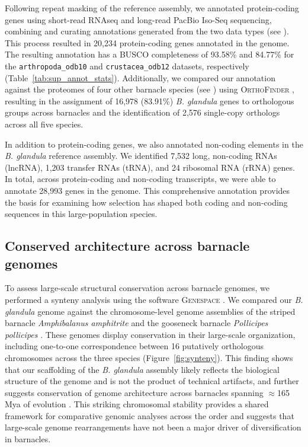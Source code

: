 \documentclass[11pt]{article}
\newcommand{\bgla}{\textit{B. glandula}\xspace}
\begin{document}
Following repeat masking of the reference assembly, we annotated protein-coding
genes using short-read RNAseq and long-read PacBio Iso-Seq sequencing, combining
and curating annotations generated from the two data types (see
). This process resulted in 20,234
protein-coding genes annotated in the genome. The resulting annotation has a
\textsc{BUSCO} completeness of 93.58\% and 84.77\% for the
\texttt{arthropoda\_odb10} and \texttt{crustacea\_odb12} datasets, respectively
(Table~\ref{tab:sup_annot_stats}). Additionally, we compared our annotation against
the proteomes of four other barnacle species (see )
using \textsc{OrthoFinder} \citep{emms_orthofinder_2015,emms_orthofinder_2019,
emms_orthofinder_2025}, resulting in the assignment of 16,978 (83.91\%) \bgla{}
genes to orthologous groups across barnacles and the identification of 2,576
single-copy orthologs across all five species.
\vspace{0.2cm}


In addition to protein-coding genes, we also annotated non-coding elements in the
\bgla{} reference assembly. We identified 7,532 long, non-coding RNAs
(lncRNA), 1,203 transfer RNAs (tRNA), and 24 ribosomal RNA (rRNA) genes. In total,
across protein-coding and non-coding transcripts, we were able to annotate 28,993
genes in the genome.
This comprehensive annotation provides the basis for examining
how selection has shaped both coding and non-coding sequences in this
large-population species.

\subsection*{Conserved architecture across barnacle genomes}


To assess large-scale structural conservation across barnacle genomes, we performed
a synteny analysis using the software \textsc{Genespace}
\citep{lovell_genespace_2022}. We compared our \bgla{} genome against the
chromosome-level genome assemblies of the striped barnacle \textit{Amphibalanus
amphitrite} \citep[Balanidae;][]{han_new_2024} and the gooseneck barnacle
\textit{Pollicipes pollicipes} \citep[Pollicipedidae;][]{bernot_chromosome-level_2022}.
These genomes display conservation in their large-scale organization, including
one-to-one correspondence between 16 putatively orthologous chromosomes across the
three species (Figure~\ref{fig:synteny}). This finding shows that our scaffolding
of the \bgla{} assembly likely reflects the biological structure of
the genome and is not the product of technical artifacts, and further suggests
conservation of genome architecture across barnacles spanning $\approx$165 Mya
of evolution \citep{han_new_2024,bernot_chromosome-level_2022}.
This striking chromosomal stability provides a shared framework for comparative
genomic analyses across the order and suggests that large-scale genome
rearrangements have not been a major driver of diversification in barnacles.
\end{document}
